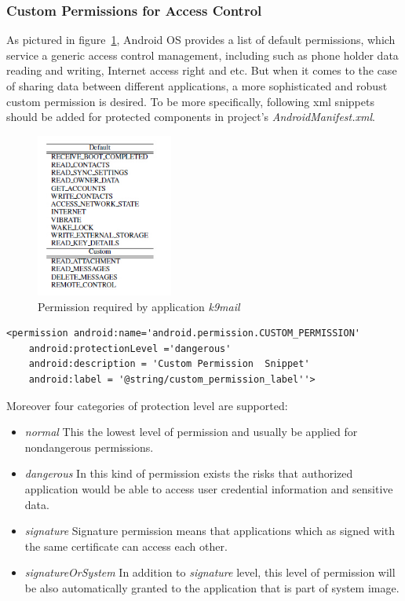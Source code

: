 \subsubsection{Custom Permissions for Access Control}
As pictured in figure~\ref{fig:android-permission2}, Android OS provides a list of default permissions, which service a generic access control management, including such as  phone  holder data reading and writing, Internet access right and etc. But when it comes to the case of sharing data between different applications, a more sophisticated and robust custom permission is desired. To be more specifically, following xml snippets should be added for protected components in project's \emph{AndroidManifest.xml}\cite{android_secure_cook}.
\begin{figure}[!htbp]
	\centering
	\includegraphics[width=0.4\textwidth]{android-permission2.jpg}
		\caption{Permission required by application \emph{k9mail}\cite{android_secure_design}}
	\label{fig:android-permission2}
\end{figure}
\begin{verbatim}
<permission android:name='android.permission.CUSTOM_PERMISSION'
	android:protectionLevel ='dangerous'
	android:description = 'Custom Permission  Snippet'
	android:label = '@string/custom_permission_label''>
\end{verbatim} 
Moreover four categories of protection level are supported\cite{android_secure_cook}:
\begin{itemize}
\item \emph{normal} This the lowest level of permission and usually be applied for nondangerous permissions. 
\item \emph{dangerous}  In this kind of permission exists the risks that authorized application would be able to access user credential information and sensitive data.
\item \emph{signature} Signature permission means that applications  which as signed with the same certificate can access each other.
\item \emph{signatureOrSystem} In addition to \emph{signature} level, this level of permission will be also automatically granted to the application that is part of system image.
\end{itemize}
